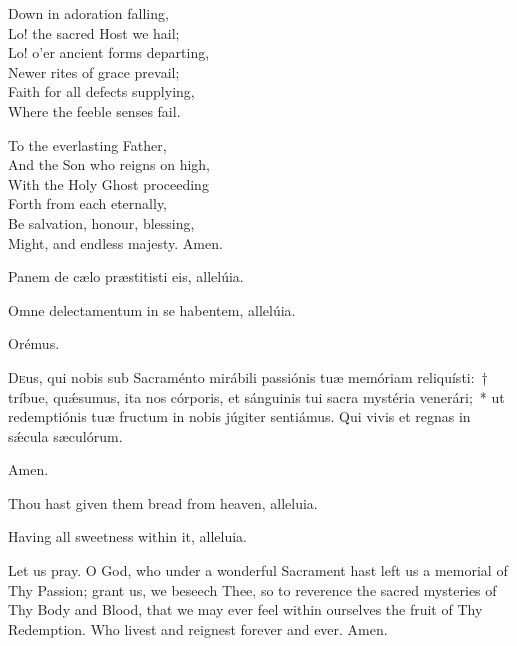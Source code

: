 \documentclass[11pt]{article}
\begin{document}
\begin{multicols}{2}
\raggedcolumns
\begin{otherlanguage}{english}
Down in adoration falling,\\
Lo! the sacred Host we hail;\\
Lo! o'er ancient forms departing,\\
Newer rites of grace prevail;\\
Faith for all defects supplying,\\
Where the feeble senses fail.

To the everlasting Father,\\
And the Son who reigns on high,\\
With the Holy Ghost proceeding\\
Forth from each eternally,\\
Be salvation, honour, blessing,\\
Might, and endless majesty.
Amen.
\end{otherlanguage}
\end{multicols}

   \begin{paracol}{2}
   
\noindent \vv Panem de cælo præstitisti eis, allelúia.

\noindent \rr Omne delectamentum in se habentem, allelúia.
  
  Orémus.
  
  \lettrine{D}{e}us, qui nobis sub Sacraménto mirábili passiónis tuæ memóriam reliquísti:~† tríbue, quǽsumus, ita nos córporis, et sánguinis tui sacra mystéria venerári;~* ut redemptiónis tuæ fructum in nobis júgiter sentiámus. Qui vivis et regnas in sǽcula sæculórum. 
  
  \rr Amen.
  \switchcolumn
\begin{otherlanguage}{english}
\noindent \vv Thou hast given them bread from heaven, alleluia.

\noindent \rr Having all sweetness within it, alleluia.

\noindent Let us pray. O God, who under a wonderful Sacrament hast left us a memorial of Thy Passion; grant us, we beseech Thee, so to reverence the sacred mysteries of Thy Body and Blood, that we may ever feel within ourselves the fruit of Thy Redemption. Who livest and reignest forever and ever. Amen.

\end{otherlanguage}
\end{paracol}
\end{document}
